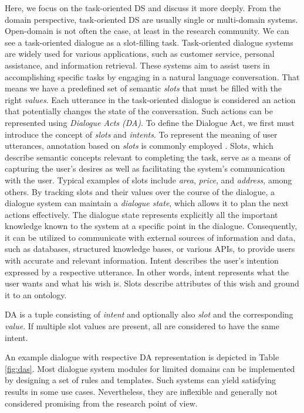 Here, we focus on the task-oriented DS and discuss it more deeply.
From the domain perspective, task-oriented DS are usually single or multi-domain systems.
Open-domain is not often the case, at least in the research community.
We can see a task-oriented dialogue as a slot-filling task.
Task-oriented dialogue systems are widely used for various applications, such as customer service, personal assistance, and information retrieval. These systems aim to assist users in accomplishing specific tasks by engaging in a natural language conversation. 
That means we have a predefined set of semantic \textit{slots} that must be filled with the right \textit{values}.
Each utterance in the task-oriented dialogue is considered an action that potentially changes the state of the conversation.
Such actions can be represented using \textit{Dialogue Acts (DA)}\cite{core1997coding}.
To define the Dialogue Act, we first must introduce the concept of \emph{slots} and \emph{intents}.
To represent the meaning of user utterances, annotation based on \emph{slots} is commonly employed \cite{young_pomdp-based_2013}. Slots, which describe semantic concepts relevant to completing the task, serve as a means of capturing the user's desires as well as facilitating the system's communication with the user. Typical examples of slots include \emph{area}, \emph{price}, and \emph{address}, among others. By tracking slots and their values over the course of the dialogue, a dialogue system can maintain a \emph{dialogue state}, which allows it to plan the next actions \cite{williams2013dialog} effectively. The dialogue state represents explicitly all the important knowledge known to the system at a specific point in the dialogue. Consequently, it can be utilized to communicate with external sources of information and data, such as databases, structured knowledge bases, or various APIs, to provide users with accurate and relevant information.
Intent describes the user's intention expressed by a respective utterance.
In other words, intent represents what the user wants and what his wish is.
Slots describe attributes of this wish and ground it to an ontology.

DA is a tuple consisting of \textit{intent} and optionally also \textit{slot} and the corresponding \textit{value}.
If multiple slot values are present, all are considered to have the same intent.

An example dialogue with respective DA representation is depicted in Table \ref{fig:das}.
Most dialogue system modules for limited domains can be implemented by designing a set of rules and templates.
Such systems can yield satisfying results in some use cases.
Nevertheless, they are inflexible and generally not considered promising from the research point of view.

